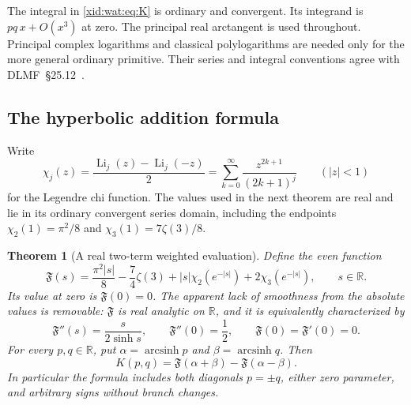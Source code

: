 \documentclass[11pt,a4paper]{article}
\numberwithin{equation}{section}
\newtheorem{theorem}{Theorem}[section]
\theoremstyle{definition}
\theoremstyle{remark}
\begin{document}
The integral in \eqref{xid:wat:eq:K} is ordinary and convergent. Its integrand
is $pq\,x+O(x^3)$ at zero. The principal real arctangent is used
throughout. Principal complex logarithms and classical polylogarithms
are needed only for the more general ordinary primitive. Their series and integral
conventions agree with DLMF~\S25.12~\cite{wat:DLMF}.

\subsection{The hyperbolic addition formula}

Write
\[
 \chi_j(z)=\frac{\operatorname{Li}_j(z)-\operatorname{Li}_j(-z)}2
          =\sum_{k=0}^{\infty}\frac{z^{2k+1}}{(2k+1)^j}
 \qquad (|z|<1)
\]
for the Legendre chi function. The values used in the next theorem
are real and lie in its ordinary convergent series domain, including
the endpoints $\chi_2(1)=\pi^2/8$ and
$\chi_3(1)=7\zeta(3)/8$.

\begin{theorem}[A real two-term weighted evaluation]
\label{xid:wat:thm:main}
Define the even function
\begin{equation}\label{xid:wat:eq:Fclosed}
 \mathfrak F(s)=\frac{\pi^2|s|}{8}-\frac74\zeta(3)
    +|s|\chi_2(e^{-|s|})+2\chi_3(e^{-|s|}),
 \qquad s\in\mathbb R.
\end{equation}
Its value at zero is $\mathfrak F(0)=0$. The apparent lack of
smoothness from the absolute values is removable: $\mathfrak F$ is
real analytic on $\mathbb R$, and it is equivalently characterized by
\begin{equation}\label{xid:wat:eq:Fode}
 \mathfrak F''(s)=\frac{s}{2\sinh s},\qquad
 \mathfrak F''(0)=\frac12,\qquad
 \mathfrak F(0)=\mathfrak F'(0)=0.
\end{equation}
For every $p,q\in\mathbb R$, put
$\alpha=\operatorname{arcsinh}p$ and
$\beta=\operatorname{arcsinh}q$. Then
\begin{equation}\label{xid:wat:eq:main}
 \boxed{\displaystyle
 K(p,q)=\mathfrak F(\alpha+\beta)-\mathfrak F(\alpha-\beta).}
\end{equation}
In particular the formula includes both diagonals $p=\pm q$,
either zero parameter, and arbitrary signs without branch changes.
\end{theorem}
\end{document}
